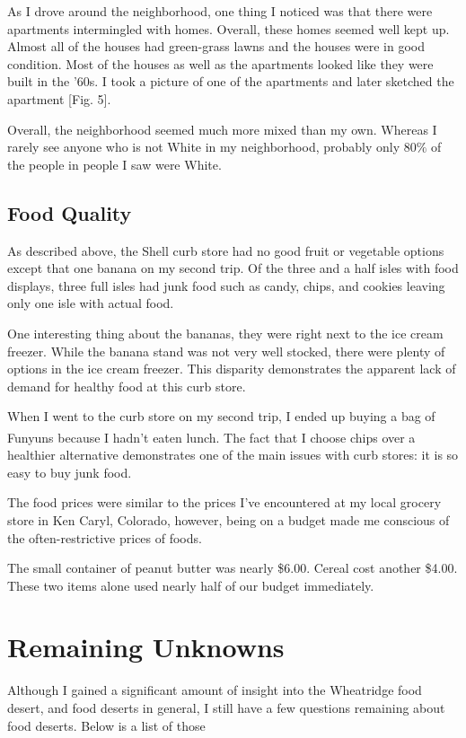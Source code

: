 \documentclass[11pt]{article}
\begin{document}
As I drove around the neighborhood, one thing I noticed was that there were apartments intermingled
with homes. Overall, these homes seemed well kept up. Almost all of the houses had green-grass lawns
and the houses were in good condition. Most of the houses as well as the apartments looked like they
were built in the '60s. I took a picture of one of the apartments and later sketched the apartment
[Fig. 5].

Overall, the neighborhood seemed much more mixed than my own. Whereas I rarely see anyone who is not
White in my neighborhood, probably only $80\%$ of the people in people I saw were White.

\subsection{Food Quality}
As described above, the Shell curb store had no good fruit or vegetable options except that one
banana on my second trip. Of the three and a half isles with food displays, three full isles had
junk food such as candy, chips, and cookies leaving only one isle with actual food.

One interesting thing about the bananas, they were right next to the ice cream freezer. While the
banana stand was not very well stocked, there were plenty of options in the ice cream freezer. This
disparity demonstrates the apparent lack of demand for healthy food at this curb store.

When I went to the curb store on my second trip, I ended up buying a bag of
Funyuns\textsuperscript{\textregistered} because I hadn't eaten lunch. The fact that I choose chips
over a healthier alternative demonstrates one of the main issues with curb stores: it is so easy to
buy junk food.

The food prices were similar to the prices I've encountered at my local grocery store in Ken Caryl,
Colorado, however, being on a budget made me conscious of the often-restrictive prices of foods.

The small container of peanut butter was nearly \$6.00. Cereal cost another \$4.00. These two items
alone used nearly half of our budget immediately.

\section{Remaining Unknowns}
Although I gained a significant amount of insight into the Wheatridge food desert, and food deserts
in general, I still have a few questions remaining about food deserts. Below is a list of those
\end{document}
